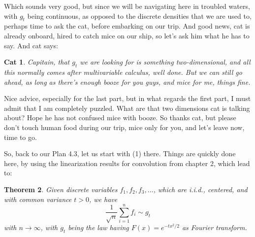 \documentclass[12pt]{amsbook}
\newtheorem{theorem}{Theorem}[chapter]
\newtheorem{cat}[theorem]{Cat}
\begin{document}
Which sounds very good, but since we will be navigating here in troubled waters, with $g_t$ being continuous, as opposed to the discrete densities that we are used to, perhaps time to ask the cat, before embarking on our trip. And good news, cat is already onboard, hired to catch mice on our ship, so let's ask him what he has to say. And cat says:

\begin{cat}
Capitain, that $g_t$ we are looking for is something two-dimensional, and all this normally comes after multivariable calculus, well done. But we can still go ahead, as long as there's enough booze for you guys, and mice for me, things fine.
\end{cat}

Nice advice, especially for the last part, but in what regards the first part, I must admit that I am completely puzzled. What are that two dimensions cat is talking about? Hope he has not confused mice with booze. So thanks cat, but please don't touch human food during our trip, mice only for you, and let's leave now, time to go.

\bigskip

So, back to our Plan 4.3, let us start with (1) there. Things are quickly done here, by using the linearization results for convolution from chapter 2, which lead to:

\begin{theorem}
Given discrete variables $f_1,f_2,f_3,\ldots$, which are i.i.d., centered, and with common variance $t>0$, we have
$$\frac{1}{\sqrt{n}}\sum_{i=1}^nf_i\sim g_t$$
with $n\to\infty$, with $g_t$ being the law having $F(x)=e^{-tx^2/2}$ as Fourier transform.
\end{theorem}
\end{document}
